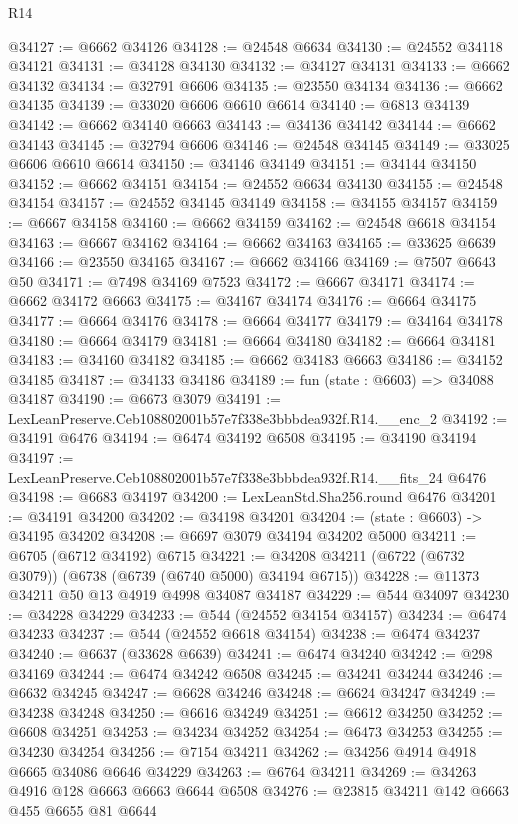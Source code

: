 \begin{lexlean}{R14}
\begin{coremodule}
@34127 := @6662 @34126
@34128 := @24548 @6634
@34130 := @24552 @34118 @34121
@34131 := @34128 @34130
@34132 := @34127 @34131
@34133 := @6662 @34132
@34134 := @32791 @6606
@34135 := @23550 @34134
@34136 := @6662 @34135
@34139 := @33020 @6606 @6610 @6614
@34140 := @6813 @34139
@34142 := @6662 @34140 @6663
@34143 := @34136 @34142
@34144 := @6662 @34143
@34145 := @32794 @6606
@34146 := @24548 @34145
@34149 := @33025 @6606 @6610 @6614
@34150 := @34146 @34149
@34151 := @34144 @34150
@34152 := @6662 @34151
@34154 := @24552 @6634 @34130
@34155 := @24548 @34154
@34157 := @24552 @34145 @34149
@34158 := @34155 @34157
@34159 := @6667 @34158
@34160 := @6662 @34159
@34162 := @24548 @6618 @34154
@34163 := @6667 @34162
@34164 := @6662 @34163
@34165 := @33625 @6639
@34166 := @23550 @34165
@34167 := @6662 @34166
@34169 := @7507 @6643 @50
@34171 := @7498 @34169 @7523
@34172 := @6667 @34171
@34174 := @6662 @34172 @6663
@34175 := @34167 @34174
@34176 := @6664 @34175
@34177 := @6664 @34176
@34178 := @6664 @34177
@34179 := @34164 @34178
@34180 := @6664 @34179
@34181 := @6664 @34180
@34182 := @6664 @34181
@34183 := @34160 @34182
@34185 := @6662 @34183 @6663
@34186 := @34152 @34185
@34187 := @34133 @34186
@34189 := fun (state : @6603) => @34088 @34187
@34190 := @6673 @3079
@34191 := LexLeanPreserve.Ceb108802001b57e7f338e3bbbdea932f.R14.__enc_2
@34192 := @34191 @6476
@34194 := @6474 @34192 @6508
@34195 := @34190 @34194
@34197 := LexLeanPreserve.Ceb108802001b57e7f338e3bbbdea932f.R14.__fits_24 @6476
@34198 := @6683 @34197
@34200 := LexLeanStd.Sha256.round @6476
@34201 := @34191 @34200
@34202 := @34198 @34201
@34204 := (state : @6603) -> @34195 @34202
@34208 := @6697 @3079 @34194 @34202 @5000
@34211 := @6705 (@6712 @34192) @6715
@34221 := @34208 @34211 (@6722 (@6732 @3079)) (@6738 (@6739 (@6740 @5000) @34194 @6715))
@34228 := @11373 @34211 @50 @13 @4919 @4998 @34087 @34187
@34229 := @544 @34097
@34230 := @34228 @34229
@34233 := @544 (@24552 @34154 @34157)
@34234 := @6474 @34233
@34237 := @544 (@24552 @6618 @34154)
@34238 := @6474 @34237
@34240 := @6637 (@33628 @6639)
@34241 := @6474 @34240
@34242 := @298 @34169
@34244 := @6474 @34242 @6508
@34245 := @34241 @34244
@34246 := @6632 @34245
@34247 := @6628 @34246
@34248 := @6624 @34247
@34249 := @34238 @34248
@34250 := @6616 @34249
@34251 := @6612 @34250
@34252 := @6608 @34251
@34253 := @34234 @34252
@34254 := @6473 @34253
@34255 := @34230 @34254
@34256 := @7154 @34211
@34262 := @34256 @4914 @4918 @6665 @34086 @6646 @34229
@34263 := @6764 @34211
@34269 := @34263 @4916 @128 @6663 @6663 @6644 @6508
@34276 := @23815 @34211 @142 @6663 @455 @6655 @81 @6644

\end{coremodule}
\end{lexlean}
